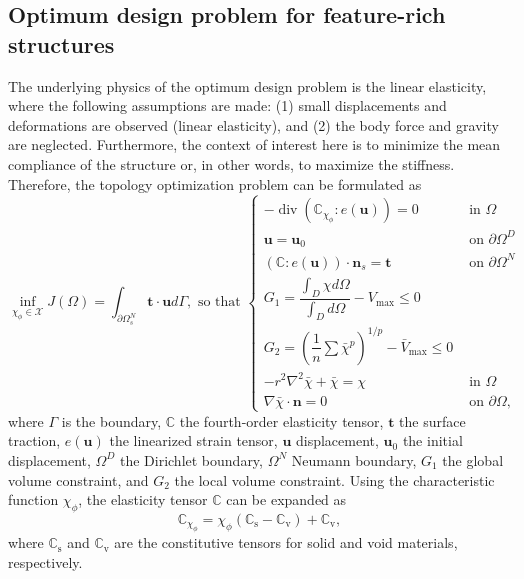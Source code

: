 \begin{subappendices}
\subsection{Optimum design problem for feature-rich structures}\label{Section: topology optimization problem}

The underlying physics of the optimum design problem is the linear elasticity, where the following assumptions are made: (1) small displacements and deformations are observed (linear elasticity), and (2) the body force and gravity are neglected. Furthermore, the context of interest here is to minimize the mean compliance of the structure or, in other words, to maximize the stiffness. Therefore, the topology optimization problem can be formulated as
\begin{subequations}
	\begin{equation}
		\inf _{\chi_{\phi} \in \mathcal{X}} J(\Omega)=\int_{\partial \Omega_{s}^{N}} \boldsymbol{t} \cdot \boldsymbol{u} d \Gamma,
		\label{eq: objective function}
	\end{equation}
	\begin{equation}
		\text { so that }\left\{\begin{array}{ll}
			-\operatorname{div}(\mathbb{C}_{\chi_{\phi}} : e(\boldsymbol{u}))=0 & \text { in } \Omega \\
			\boldsymbol{u}=\boldsymbol{u}_{0} & \text { on } \partial \Omega^{D} \\
			(\mathbb{C}: e(\boldsymbol{u})) \cdot \boldsymbol{n}_{s}=\mathbf{t} & \text { on } \partial \Omega^{N} \\
			G_{1}=\dfrac{\int_{D} \chi d \Omega}{\int_{D} d \Omega}-V_{\max } \leq 0 & \\
			G_2=\left(\dfrac{1}{n} \sum \bar{\chi}^{p}\right)^{1 / p}-\bar{V}_{\max } \leq 0 & \\
			-r^2 \nabla^2 \bar{\chi} +  \bar{\chi} =  \chi & \text{ in } \Omega \\
			\nabla \bar{\chi} \cdot \boldsymbol{n} = 0 & \text{ on } \partial \Omega,
		\end{array}\right.
		\label{eq: governing equation and constraints}
	\end{equation}
	\label{eq: topology optimization mathematical model}
\end{subequations}
where $\Gamma$ is the boundary, $\mathbb{C}$ the fourth-order elasticity tensor, $\boldsymbol{t}$ the surface traction, $e\left(\boldsymbol{u}\right)$ the linearized strain tensor, $\boldsymbol{u}$ displacement, $\boldsymbol{u}_0$ the initial displacement, $\Omega^{D}$ the Dirichlet boundary, $\Omega^{N}$ Neumann boundary, $G_1$ the global volume constraint, and $G_2$ the local volume constraint. Using the characteristic function $\chi_{\phi}$, the elasticity tensor $\mathbb{C}$ can be expanded as
\begin{equation}
	\mathbb{C}_{\chi_{\phi}} = \chi_{\phi} \left(\mathbb{C}_{\text{s}} - \mathbb{C}_{\text{v}} \right) + \mathbb{C}_{\text{v}},
\end{equation}
where $\mathbb{C}_{\text{s}}$ and $\mathbb{C}_{\text{v}}$ are the constitutive tensors for solid and void materials, respectively.


\end{subappendices}
